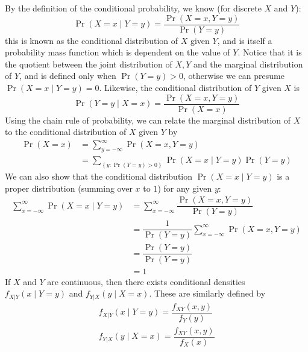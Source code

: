 \documentclass[11pt]{report} %
\begin{document}
By the definition of the conditional probability, we know (for discrete $X$ and $Y$):
\begin{equation}
\operatorname{Pr}\left(X = x\middle|Y = y\right) = \dfrac{\operatorname{Pr}\left(X = x, Y = y\right)}{\operatorname{Pr}\left(Y = y\right)}
\end{equation}
this is known as the conditional distribution of $X$ given $Y$, and is itself a probability mass function which is dependent on the value of $Y$. Notice that it is the quotient between the joint distribution of $X, Y$ and the marginal distribution of $Y$, and is defined only when $\operatorname{Pr}\left(Y = y\right) > 0$, otherwise we can presume $\operatorname{Pr}\left(X = x\middle|Y = y\right) = 0$. Likewise, the conditional distribution of $Y$ given $X$ is
\begin{equation}
\operatorname{Pr}\left(Y = y\middle|X = x\right) = \dfrac{\operatorname{Pr}\left(X = x, Y = y\right)}{\operatorname{Pr}\left(X = x\right)}
\end{equation}
Using the chain rule of probability, we can relate the marginal distribution of $X$ to the conditional distribution of $X$ given $Y$ by
\begin{align}
\operatorname{Pr}\left(X = x\right) &= \sum_{y = -\infty}^{\infty}\operatorname{Pr}\left(X = x, Y = y\right)\\
&= \sum_{\left\{y: \operatorname{Pr}\left(Y = y\right) > 0\right\}}\operatorname{Pr}\left(X = x\middle|Y = y\right)\operatorname{Pr}\left(Y = y\right)
\end{align}
We can also show that the conditional distribution $\operatorname{Pr}\left(X = x\middle|Y = y\right)$ is a proper distribution (summing over $x$ to $1$) for any given $y$:
\begin{align}
\sum_{x = -\infty}^{\infty}\operatorname{Pr}\left(X = x\middle|Y = y\right) &= \sum_{x = -\infty}^{\infty}\dfrac{\operatorname{Pr}\left(X = x, Y = y\right)}{\operatorname{Pr}\left(Y = y\right)} \\
&= \dfrac{1}{\operatorname{Pr}\left(Y = y\right)}\sum_{x = -\infty}^{\infty}\operatorname{Pr}\left(X = x, Y = y\right) \\
&= \dfrac{\operatorname{Pr}\left(Y = y\right)}{\operatorname{Pr}\left(Y = y\right)} \\
&= 1
\end{align}
If $X$ and $Y$ are continuous, then there exists conditional densities $f_{X|Y}\left(x\middle|Y = y\right)$ and $f_{Y|X}\left(y\middle|X = x\right)$. These are similarly defined by
\begin{gather}
f_{X|Y}\left(x\middle|Y = y\right) = \dfrac{f_{XY}\left(x, y\right)}{f_{Y}\left(y\right)} \\
f_{Y|X}\left(y\middle|X = x\right) = \dfrac{f_{XY}\left(x, y\right)}{f_{X}\left(x\right)} 
\end{gather}
\end{document}
